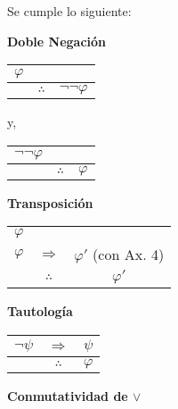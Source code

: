\documentclass[12pt]{report}
\theoremstyle{largebreak}
\begin{document}
    \begin{propo}
        Se cumple lo siguiente:
        \begin{center}
            \textbf{Doble Negación}
        \end{center}
        \begin{center}
            \begin{tabular}{c c c}
                $\varphi$ &  &  \\
                \hline
                 & $\therefore$ & $\neg\neg\varphi$ \\
            \end{tabular}
        \end{center}
        y,
        \begin{center}
            \begin{tabular}{c c c}
                $\neg\neg\varphi$ &  &  \\
                \hline
                 & $\therefore$ & $\varphi$ \\
            \end{tabular}
        \end{center}
        \begin{center}
            \textbf{Transposición}
        \end{center}
        \begin{center}
            \begin{tabular}{c c c}
                $\varphi$ &  &  \\
                $\varphi$ & $\Rightarrow$ & $\varphi'$ (con Ax. 4) \\
                \hline
                 & $\therefore$ & $\varphi'$ \\
            \end{tabular}
        \end{center}
        \begin{center}
            \textbf{Tautología}
        \end{center}
        \begin{center}
            \begin{tabular}{c c c}
                $\neg\psi$ & $\Rightarrow$ & $\psi$ \\
                \hline
                 & $\therefore$ & $\varphi$ \\
            \end{tabular}
        \end{center}
        \begin{center}
            \textbf{Conmutatividad de $\lor$}

\end{center}
\end{propo}
\end{document}
